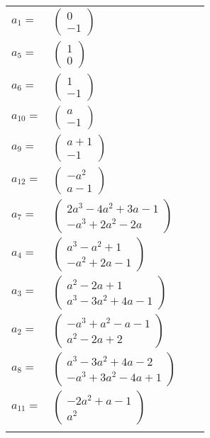 \documentclass[1p]{elsarticle_modified}
\theoremstyle{definition}
\begin{document}
\begin{tabular}{m{7pt} m{180pt} m{7pt} m{180pt} }
\flushright $a_{1}=$&$\begin{pmatrix}0\\-1\end{pmatrix}$ \\
\flushright $a_{5}=$&$\begin{pmatrix}1\\0\end{pmatrix}$ \\
\flushright $a_{6}=$&$\begin{pmatrix}1\\-1\end{pmatrix}$ \\
\flushright $a_{10}=$&$\begin{pmatrix}a\\-1\end{pmatrix}$ \\
\flushright $a_{9}=$&$\begin{pmatrix}a+1\\-1\end{pmatrix}$ \\
\flushright $a_{12}=$&$\begin{pmatrix}- a^2\\a-1\end{pmatrix}$ \\
\flushright $a_{7}=$&$\begin{pmatrix}2 a^3-4 a^2+3 a-1\\- a^3+2 a^2-2 a\end{pmatrix}$ \\
\flushright $a_{4}=$&$\begin{pmatrix}a^3- a^2+1\\- a^2+2 a-1\end{pmatrix}$ \\
\flushright $a_{3}=$&$\begin{pmatrix}a^2-2 a+1\\a^3-3 a^2+4 a-1\end{pmatrix}$ \\
\flushright $a_{2}=$&$\begin{pmatrix}- a^3+a^2- a-1\\a^2-2 a+2\end{pmatrix}$ \\
\flushright $a_{8}=$&$\begin{pmatrix}a^3-3 a^2+4 a-2\\- a^3+3 a^2-4 a+1\end{pmatrix}$ \\
\flushright $a_{11}=$&$\begin{pmatrix}-2 a^2+a-1\\a^2\end{pmatrix}$\\&\end{tabular}
\end{document}
